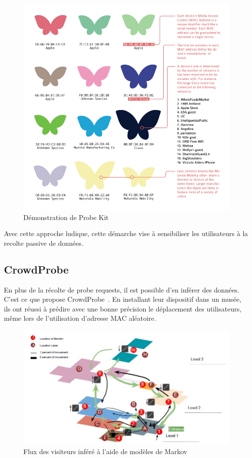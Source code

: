 \begin{figure}[H]
	\centering
	\includegraphics[width=12cm]{images/probekit.png}
	\caption{Démonstration de Probe Kit}
	\label{fig:probekit}
\end{figure}

Avec cette approche ludique, cette démarche vise à sensibiliser les utilisateurs à la recolte passive de données.

\subsection{CrowdProbe}

En plus de la récolte de probe requests, il est possible d'en inférer des données. C'est ce que propose CrowdProbe~\cite{crowdprobe}. 
En installant leur dispositif dans un musée, ils ont réussi à prédire avec une bonne précision le déplacement des utilisateurs, même lors de l'utilisation d'adresse MAC aléatoire.

\begin{figure}[H]
	\centering
	\includegraphics[width=12cm]{images/crowd-probe.jpeg}
	\caption{Flux des visiteurs inféré à l'aide de modèles de Markov}
	\label{fig:crowdprobe}
\end{figure}

